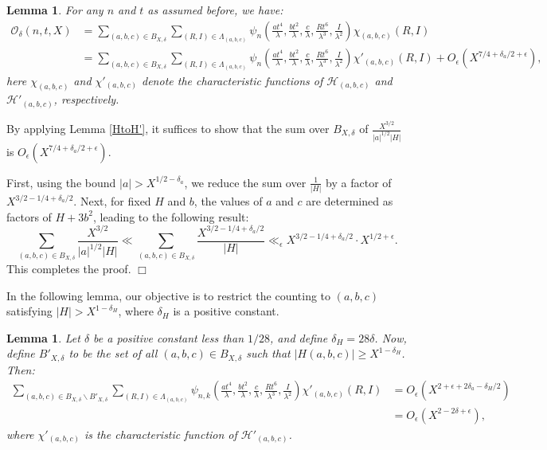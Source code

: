 \documentclass{article}
\def\H{{\mathcal H}}
\def\H{{\mathcal H}}
\newtheorem{lemma}[theorem]{Lemma}
\newenvironment{proof}{\noindent {\bf Proof:}}{$\Box$ \vspace{2 ex}}
\def \Bodi{{\mathcal{O}}_{\delta}(n,t,X)}
\begin{document}
\begin{lemma}\label{S-Counting-Reduced} 
 For any $n$ and $t$ as assumed before, we have:
\begin{equation*}
\begin{split}
\Bodi &=
\sum_{(a, b, c) \in B_{X, \delta}} \sum_{(R, I) \in \Lambda_{(a, b, c)}} \psi_{n}\left(\frac{at^4}{\lambda}, \frac{bt^2}{\lambda}, \frac{c}{\lambda}, \frac{Rt^6}{\lambda^3}, \frac{I}{\lambda^2}\right) \chi_{{(a, b, c)}}(R, I) \\
&= \sum_{(a, b, c) \in B_{X, \delta}} \sum_{(R, I) \in \Lambda_{(a, b, c)}} \psi_{n}\left(\frac{at^4}{\lambda}, \frac{bt^2}{\lambda}, \frac{c}{\lambda}, \frac{Rt^6}{\lambda^3}, \frac{I}{\lambda^2}\right) \chi'_{{(a, b, c)}}(R, I) 
+ O_{\epsilon}(X^{7/4 + \delta_a/2 + \epsilon}),
\end{split}
\end{equation*}
here $\chi_{{(a, b, c)}}$ and $\chi'_{{(a, b, c)}}$ denote the characteristic functions of $\H_{(a, b, c)}$ and $\H'_{(a, b, c)}$, respectively.
\end{lemma}
\begin{proof}
By applying Lemma \ref{HtoH'}, it suffices to show that the sum over $B_{X,\delta}$ of $\frac{X^{3/2}}{|a|^{1/2}|H|}$ is $O_{\epsilon}(X^{7/4+\delta_a/2+\epsilon})$.  

First, using the bound $|a| > X^{1/2 - \delta_a}$, we reduce the sum over $\frac{1}{|H|}$ by a factor of $X^{3/2 - 1/4 + \delta_a/2}$. Next, for fixed $H$ and $b$, the values of $a$ and $c$ are determined as factors of $H + 3b^2$, leading to the following result:
\begin{equation*}
     \sum_{(a,b,c) \in B_{X,\delta}} \frac{X^{3/2}}{|a|^{1/2}|H|}  \ll
    \sum_{(a,b,c) \in B_{X,\delta}} \frac{X^{3/2-1/4+\delta_a/2}}{|H|}  \ll_{\epsilon}
    X^{3/2-1/4+\delta_a/2}\cdot X^{1/2+\epsilon}.    
\end{equation*} 
This completes the proof.
\end{proof}

In the following lemma, our objective is to restrict the counting to $(a, b, c)$ satisfying $|H| > X^{1-\delta_H}$, where $\delta_H$ is a positive constant.

\begin{lemma}\label{H-Is-Big}
Let $\delta$ be a positive constant less than $1/28$, and define $\delta_H = 28\delta$. Now, define $B'_{X,\delta}$ to be the set of all $(a,b,c) \in B_{X,\delta}$ such that $|H(a,b,c)| \geqslant X^{1-\delta_H}$. Then:
\begin{equation*}
\begin{split}
    \sum_{(a,b,c)\in B_{X,\delta} \backslash B'_{X,\delta}} \sum_{(R,I) \in \Lambda_{(a,b,c)}} \psi _{n,k}\left(\frac{at^4}{\lambda},\frac{bt^2}{\lambda},\frac{c}{\lambda},\frac{Rt^6}{\lambda^3},\frac{I}{\lambda^2}\right) \chi'_{{(a,b,c)}}(R,I) &= O_{\epsilon}(X^{2+\epsilon+2\delta_a-\delta_H/2}) \\ &= O_{\epsilon}(X^{2-2\delta+\epsilon}),
\end{split}  
\end{equation*}
where $\chi'_{(a,b,c)}$ is the characteristic function of $\H'_{(a,b,c)}$.
\end{lemma}
\end{document}
